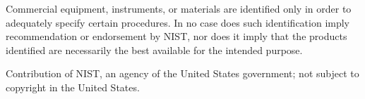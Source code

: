\documentclass[journal=jced,manuscript=article]{achemso}
\begin{document}
Commercial equipment, instruments, or materials are identified only in order to adequately specify certain procedures. In no case does such identification imply recommendation or endorsement by NIST, nor does it imply that the products identified are necessarily the best available for the intended purpose.

Contribution of NIST, an agency of the United States government; not subject to copyright in the United States.



%
%
%
%
%
%
\end{document}

